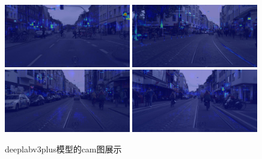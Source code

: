 \documentclass[12pt]{ctexart}
\begin{document}
\begin{figure}[htbp]  %
    \centering        %
    \includegraphics[width=0.49\textwidth]{result/plot/cam_deeplabv3plus.jpg}
    \includegraphics[width=0.49\textwidth]{result/plot/cam_1_deeplabv3plus.jpg}
    \includegraphics[width=0.49\textwidth]{result/plot/cam_2_deeplabv3plus.jpg}
    \includegraphics[width=0.49\textwidth]{result/plot/cam_3_deeplabv3plus.jpg}
    \caption{deeplabv3plus模型的cam图展示}
    \label{fig:cam_deeplabv3plus}
\end{figure}
\end{document}

